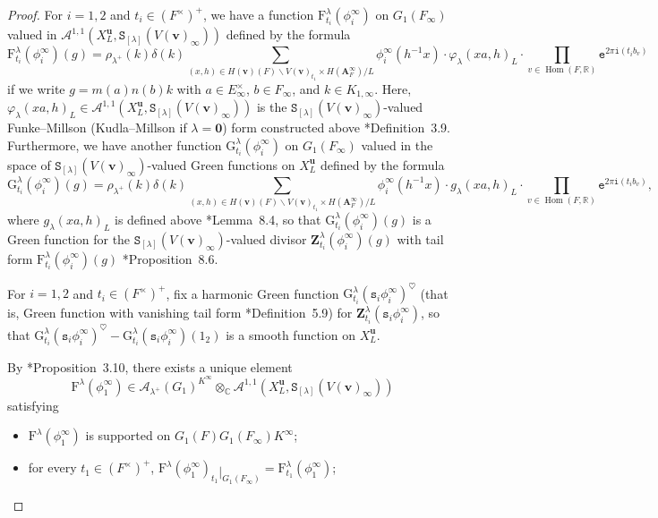 \documentclass[12pt]{amsart}
\numberwithin{equation}{section}
\theoremstyle{plain}
\theoremstyle{definition}
\theoremstyle{remark}
\renewcommand{\b}[1]{\mathbf{#1}}
\renewcommand{\c}[1]{\mathcal{#1}}
\renewcommand{\d}[1]{\mathbb{#1}}
\renewcommand{\r}[1]{\mathrm{#1}}
\newcommand{\s}[1]{\mathscr{#1}}
\renewcommand{\(}{\left(}
\renewcommand{\)}{\right)}
\newcommand{\res}{\mathbin{|}}
\newcommand{\bA}{\b A}
\newcommand{\cA}{\c A}
\newcommand{\dC}{\d C}
\newcommand{\dR}{\d R}
\newcommand{\rF}{\r F}
\newcommand{\rG}{\r G}
\newcommand{\sA}{\s A}
\newcommand{\tS}{\mathtt{S}}
\newcommand{\te}{\mathtt{e}}
\newcommand{\ti}{\mathtt{i}}
\newcommand{\ts}{\mathtt{s}}
\newcommand{\bbu}{\boldsymbol{u}}
\newcommand{\bbv}{\boldsymbol{v}}
\newcommand{\bbZ}{\boldsymbol{Z}}
\DeclareMathOperator{\Hom}{Hom}
\begin{document}
\begin{proof}
For $i=1,2$ and $t_i\in(F^\times)^+$, we have a function $\rF^\lambda_{t_i}(\phi^\infty_i)$ on $G_1(F_\infty)$ valued in $\sA^{1,1}(X_L^{\bbu},\tS_{[\lambda]}(V(\bbv)_\infty))$ defined by the formula
\[
\rF^\lambda_{t_i}(\phi^\infty_i)(g)=\rho_{\lambda^+}(k)\delta(k)
\sum_{(x,h)\in H(\bbv)(F)\backslash V(\bbv)_{t_1}\times H(\bA_F^\infty)/L}\phi^\infty_i(h^{-1}x)\cdot \varphi_\lambda(xa,h)_L\cdot\prod_{v\in\Hom(F,\dR)}\te^{2\pi\ti(t_i b_v)}
\]
if we write $g=m(a)n(b)k$ with $a\in E_\infty^\times$, $b\in F_\infty$, and $k\in K_{1,\infty}$. Here, $\varphi_\lambda(xa,h)_L\in\sA^{1,1}(X_L^{\bbu},\tS_{[\lambda]}(V(\bbv)_\infty))$ is the $\tS_{[\lambda]}(V(\bbv)_\infty)$-valued Funke--Millson (Kudla--Millson if $\lambda=\b{0}$) form constructed above \cite{Liu26}*{Definition~3.9}. Furthermore, we have another function $\rG^\lambda_{t_i}(\phi^\infty_i)$ on $G_1(F_\infty)$ valued in the space of $\tS_{[\lambda]}(V(\bbv)_\infty)$-valued Green functions on $X_L^{\bbu}$ defined by the formula
\[
\rG^\lambda_{t_i}(\phi^\infty_i)(g)=\rho_{\lambda^+}(k)\delta(k)
\sum_{(x,h)\in H(\bbv)(F)\backslash V(\bbv)_{t_1}\times H(\bA_F^\infty)/L}\phi^\infty_i(h^{-1}x)\cdot g_\lambda(xa,h)_L\cdot\prod_{v\in\Hom(F,\dR)}\te^{2\pi\ti(t_i b_v)},
\]
where $g_\lambda(xa,h)_L$ is defined above \cite{Liu26}*{Lemma~8.4}, so that $\rG^\lambda_{t_i}(\phi^\infty_i)(g)$ is a Green function for the $\tS_{[\lambda]}(V(\bbv)_\infty)$-valued divisor $\bbZ^\lambda_{t_i}(\phi^\infty_i)(g)$ with tail form $\rF^\lambda_{t_i}(\phi^\infty_i)(g)$ \cite{Liu26}*{Proposition~8.6}.


For $i=1,2$ and $t_i\in(F^\times)^+$, fix a harmonic Green function $\rG_{t_i}^\lambda(\ts_i\phi^\infty_i)^\heartsuit$ (that is, Green function with vanishing tail form \cite{Liu26}*{Definition~5.9}) for $\bbZ^\lambda_{t_i}(\ts_i\phi^\infty_i)$, so that $\rG_{t_i}^\lambda(\ts_i\phi^\infty_i)^\heartsuit-\rG_{t_i}^\lambda(\ts_i\phi^\infty_i)(1_2)$ is a smooth function on $X_L^{\bbu}$.

By \cite{Liu26}*{Proposition~3.10}, there exists a unique element
\[
\rF^\lambda(\phi^\infty_1)\in\cA_{\lambda^+}(G_1)^{K^\infty}\otimes_\dC\sA^{1,1}(X_L^{\bbu},\tS_{[\lambda]}(V(\bbv)_\infty))
\]
satisfying
\begin{itemize}
  \item $\rF^\lambda(\phi^\infty_1)$ is supported on $G_1(F)G_1(F_\infty)K^\infty$;

  \item for every $t_1\in(F^\times)^+$, $\rF^\lambda(\phi^\infty_1)_{t_1}\res_{G_1(F_\infty)}=\rF^\lambda_{t_1}(\phi^\infty_1)$;


\end{itemize}
\end{proof}
\end{document}
